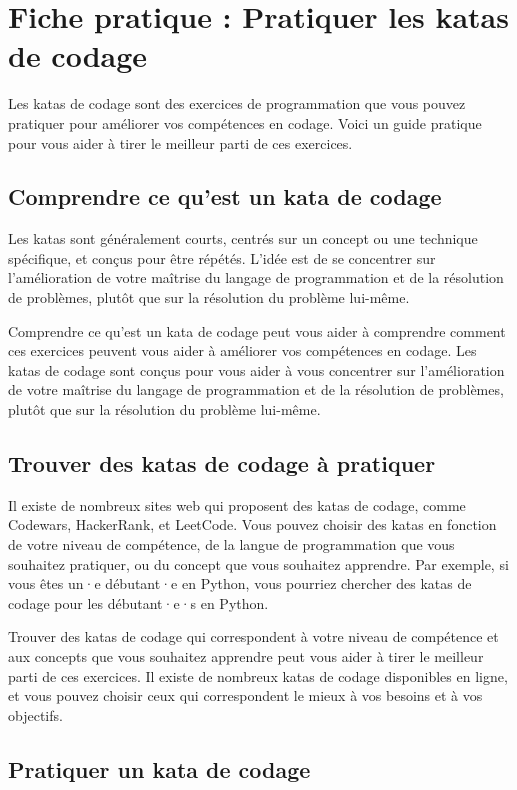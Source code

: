 \chapter{Fiche pratique : Pratiquer les katas de codage}

Les katas de codage sont des exercices de programmation que vous pouvez pratiquer pour améliorer vos compétences en codage. Voici un guide pratique pour vous aider à tirer le meilleur parti de ces exercices.

\section{Comprendre ce qu'est un kata de codage}

Les katas sont généralement courts, centrés sur un concept ou une technique spécifique, et conçus pour être répétés. L'idée est de se concentrer sur l'amélioration de votre maîtrise du langage de programmation et de la résolution de problèmes, plutôt que sur la résolution du problème lui-même.

Comprendre ce qu'est un kata de codage peut vous aider à comprendre comment ces exercices peuvent vous aider à améliorer vos compétences en codage. Les katas de codage sont conçus pour vous aider à vous concentrer sur l'amélioration de votre maîtrise du langage de programmation et de la résolution de problèmes, plutôt que sur la résolution du problème lui-même.

\section{Trouver des katas de codage à pratiquer}

Il existe de nombreux sites web qui proposent des katas de codage, comme Codewars, HackerRank, et LeetCode. Vous pouvez choisir des katas en fonction de votre niveau de compétence, de la langue de programmation que vous souhaitez pratiquer, ou du concept que vous souhaitez apprendre. Par exemple, si vous êtes un·e débutant·e en Python, vous pourriez chercher des katas de codage pour les débutant·e·s en Python.

Trouver des katas de codage qui correspondent à votre niveau de compétence et aux concepts que vous souhaitez apprendre peut vous aider à tirer le meilleur parti de ces exercices. Il existe de nombreux katas de codage disponibles en ligne, et vous pouvez choisir ceux qui correspondent le mieux à vos besoins et à vos objectifs.

\section{Pratiquer un kata de codage}

